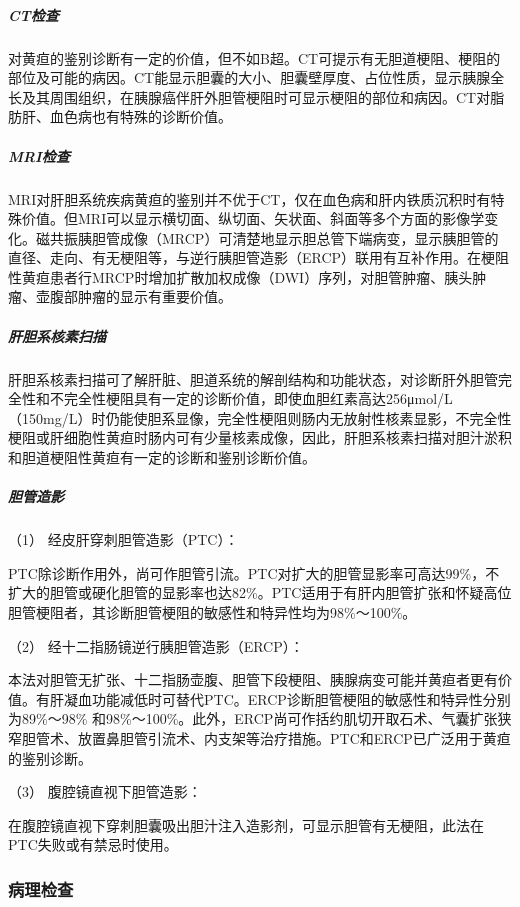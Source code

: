 \subparagraph{CT检查}

对黄疸的鉴别诊断有一定的价值，但不如B超。CT可提示有无胆道梗阻、梗阻的部位及可能的病因。CT能显示胆囊的大小、胆囊壁厚度、占位性质，显示胰腺全长及其周围组织，在胰腺癌伴肝外胆管梗阻时可显示梗阻的部位和病因。CT对脂肪肝、血色病也有特殊的诊断价值。

\subparagraph{MRI检查}

MRI对肝胆系统疾病黄疸的鉴别并不优于CT，仅在血色病和肝内铁质沉积时有特殊价值。但MRI可以显示横切面、纵切面、矢状面、斜面等多个方面的影像学变化。磁共振胰胆管成像（MRCP）可清楚地显示胆总管下端病变，显示胰胆管的直径、走向、有无梗阻等，与逆行胰胆管造影（ERCP）联用有互补作用。在梗阻性黄疸患者行MRCP时增加扩散加权成像（DWI）序列，对胆管肿瘤、胰头肿瘤、壶腹部肿瘤的显示有重要价值。

\subparagraph{肝胆系核素扫描}

肝胆系核素扫描可了解肝脏、胆道系统的解剖结构和功能状态，对诊断肝外胆管完全性和不完全性梗阻具有一定的诊断价值，即使血胆红素高达256μmol/L（150mg/L）时仍能使胆系显像，完全性梗阻则肠内无放射性核素显影，不完全性梗阻或肝细胞性黄疸时肠内可有少量核素成像，因此，肝胆系核素扫描对胆汁淤积和胆道梗阻性黄疸有一定的诊断和鉴别诊断价值。

\subparagraph{胆管造影}

\hypertarget{text00039.htmlux5cux23CHP1-16-3-6-5-1}{}
（1） 经皮肝穿刺胆管造影（PTC）：

PTC除诊断作用外，尚可作胆管引流。PTC对扩大的胆管显影率可高达99\%，不扩大的胆管或硬化胆管的显影率也达82\%。PTC适用于有肝内胆管扩张和怀疑高位胆管梗阻者，其诊断胆管梗阻的敏感性和特异性均为98\%～100\%。

\hypertarget{text00039.htmlux5cux23CHP1-16-3-6-5-2}{}
（2） 经十二指肠镜逆行胰胆管造影（ERCP）：

本法对胆管无扩张、十二指肠壶腹、胆管下段梗阻、胰腺病变可能并黄疸者更有价值。有肝凝血功能减低时可替代PTC。ERCP诊断胆管梗阻的敏感性和特异性分别为89\%～98\%
和98\%～100\%。此外，ERCP尚可作括约肌切开取石术、气囊扩张狭窄胆管术、放置鼻胆管引流术、内支架等治疗措施。PTC和ERCP已广泛用于黄疸的鉴别诊断。

\hypertarget{text00039.htmlux5cux23CHP1-16-3-6-5-3}{}
（3） 腹腔镜直视下胆管造影：

在腹腔镜直视下穿刺胆囊吸出胆汁注入造影剂，可显示胆管有无梗阻，此法在PTC失败或有禁忌时使用。

\subsubsection{病理检查}

